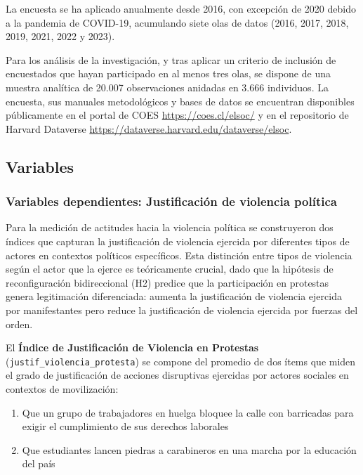 \documentclass[
  13pt,
]{article}
\providecommand{\tightlist}{%
  \setlength{\itemsep}{0pt}\setlength{\parskip}{0pt}}
\begin{document}
La encuesta se ha aplicado anualmente desde 2016, con excepción de 2020
debido a la pandemia de COVID-19, acumulando siete olas de datos (2016,
2017, 2018, 2019, 2021, 2022 y 2023).

Para los análisis de la investigación, y tras aplicar un criterio de
inclusión de encuestados que hayan participado en al menos tres olas, se
dispone de una muestra analítica de 20.007 observaciones anidadas en
3.666 individuos. La encuesta, sus manuales metodológicos y bases de
datos se encuentran disponibles públicamente en el portal de COES
\url{https://coes.cl/elsoc/} y en el repositorio de Harvard Dataverse
\url{https://dataverse.harvard.edu/dataverse/elsoc}.

\subsection{Variables}\label{variables}

\subsubsection{Variables dependientes: Justificación de violencia
política}\label{variables-dependientes-justificaciuxf3n-de-violencia-poluxedtica}

Para la medición de actitudes hacia la violencia política se
construyeron dos índices que capturan la justificación de violencia
ejercida por diferentes tipos de actores en contextos políticos
específicos. Esta distinción entre tipos de violencia según el actor que
la ejerce es teóricamente crucial, dado que la hipótesis de
reconfiguración bidireccional (H2) predice que la participación en
protestas genera legitimación diferenciada: aumenta la justificación de
violencia ejercida por manifestantes pero reduce la justificación de
violencia ejercida por fuerzas del orden.

El \textbf{Índice de Justificación de Violencia en Protestas}
(\texttt{justif\_violencia\_protesta}) se compone del promedio de dos
ítems que miden el grado de justificación de acciones disruptivas
ejercidas por actores sociales en contextos de movilización:

\begin{enumerate}
\def\labelenumi{\arabic{enumi}.}
\tightlist
\item
  Que un grupo de trabajadores en huelga bloquee la calle con barricadas
  para exigir el cumplimiento de sus derechos laborales
\item
  Que estudiantes lancen piedras a carabineros en una marcha por la
  educación del país
\end{enumerate}
\end{document}
